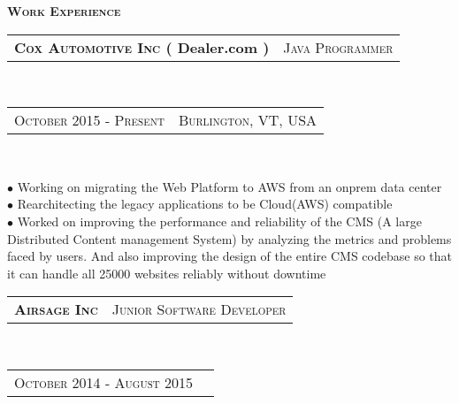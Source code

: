 \documentclass[10pt,a4paper,oneside]{article}
\begin{document}
    \begin{minipage}[t]{0.63\textwidth}
        \vspace{0pt}
        \textcolor{light-gray}{\textbf{\large W\textsc{ork} E\textsc{xperience}}}
        \vspace{10pt}\\
        \begin{tabular}{c|c}
            \textbf{\normalsize C\textsc{ox} A\textsc{utomotive} I\textsc{nc} ( Dealer.com )}
            &\textmd{\normalsize J\textsc{ava} P\textsc{rogrammer}}
        \end{tabular}\\
        \textcolor{light-gray}{
            \begin{tabular}{c|c}
                {\small O\textsc{ctober 2015} - P\textsc{resent}}
               &{\small B\textsc{urlington}, VT, USA}
            \end{tabular}
        }\\ 
        \vspace{-4mm}
        \begin{adjustwidth}{7pt}{0pt}
            {\footnotesize $\bullet$  Working on migrating the Web Platform to AWS from an onprem data center\\
            $\bullet$ Rearchitecting the legacy applications to be Cloud(AWS) compatible\\
        $\bullet$  Worked on improving the performance and reliability of the CMS (A large Distributed Content management System) by analyzing the metrics and problems faced by users. And also improving the design of the entire CMS codebase so that it can handle all 25000 websites reliably without downtime}\\
        \end{adjustwidth}
        \begin{tabular}{c|c}
            \textbf{\normalsize A\textsc{irsage} I\textsc{nc}}
            &\textmd{\normalsize J\textsc{unior} S\textsc{oftware} D\textsc{eveloper}}
        \end{tabular}\\
        \textcolor{light-gray}{
            \begin{tabular}{c|c}
                {\small O\textsc{ctober 2014} - A\textsc{ugust 2015}}

\end{tabular}}
\end{minipage}
\end{document}
